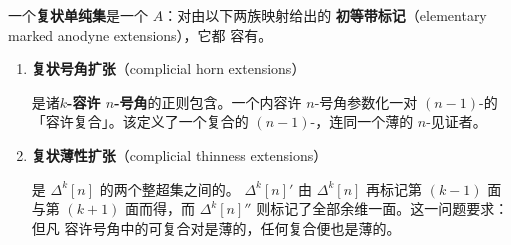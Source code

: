 \begin{definition}\label{def:complicial-set}
一个\textbf{复状单纯集}是一个\trMarkedSimplicialSet{} $A$：对由以下两族映射给出的%
\textbf{初等带标记\trAnodyneExtension}（elementary marked anodyne extensions），它都
容有\trExtension。
\begin{enumerate}[label=(\roman*)]
\item \textbf{复状号角扩张}（complicial horn extensions）
\begin{rveq}\label{eq:complicial-horn-extension}
\qquad {}%
\end{rveq}
是诸\textbf{$k$-容许 $n$-号角}的正则包含。一个内容许 $n$-号角参数化一对
$(n-1)$-\trSimplex{}的「容许复合」。该\trExtension{}定义了一个复合的 $(n-1)$-\trSimplex{}，连同一个薄的 $n$-\trSimplex{}见证者。
\item \textbf{复状薄性扩张}（complicial thinness extensions）
\begin{rveq}\label{eq:complicial-thinness-extension}
\qquad {}%
\end{rveq}
是 $\Delta^{k}[n]$ 的两个整超集之间的\trEntireInclusion。\trMarkedSimplicialSet{} $\Delta^{k}[n]'$
由 $\Delta^{k}[n]$ 再标记第 $(k-1)$ 面与第 $(k+1)$ 面而得，而
$\Delta^{k}[n]''$ 则标记了全部余维一面。这一\trExtension{}问题要求：但凡
容许号角中的可复合\trSimplex{}对是薄的，任何复合便也是薄的。
\end{enumerate}
\end{definition}

